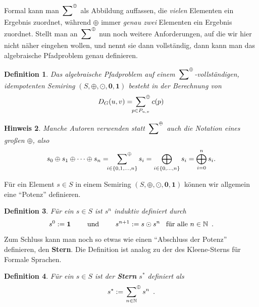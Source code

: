 \documentclass[ngerman, a4paper, 12pt]{article}
\newcommand{\satzende}{\enskip \text{.}}
\theoremstyle{mystyle}
\newtheorem{definition}{Definition}
\newtheorem{hinweis}[definition]{Hinweis}
\begin{document}
	Formal kann man $\sideset{}{^\oplus}\sum$ als Abbildung auffassen, die \textit{vielen} Elementen ein Ergebnis zuordnet, während $\oplus$ immer \textit{genau zwei} Elementen ein Ergebnis zuordnet. Stellt man an $\sideset{}{^\oplus}\sum$ nun noch weitere Anforderungen, auf die wir hier nicht näher eingehen wollen, und nennt sie dann vollständig, dann kann man das algebraische Pfadproblem genau definieren.
	
	\begin{definition}
		Das algebraische Pfadproblem auf einem $\sideset{}{^\oplus}\sum$-vollständigen, idempotenten Semiring $(S, \oplus, \odot, \mathbf{0}, \mathbf{1})$ besteht in der Berechnung von 
		\begin{equation*}
			D_G(u,v) = \sideset{}{^\oplus}\sum_{p \in P_{u,v}} c(p)
		\end{equation*}
	\end{definition}

	\begin{hinweis}
		Manche Autoren verwenden statt $\sideset{}{^\oplus}\sum$ auch die Notation eines großen $\oplus$, also
		\begin{equation*}
			s_0 \oplus s_1 \oplus \dots  \oplus s_n = \sideset{}{^\oplus}\sum_{i \in \left\{ 0, 1, \dots, n \right\}} s_i = \bigoplus_{i \in \left\{ 0, \dots, n \right\}} s_i = \bigoplus_{i=0}^n s_i.
		\end{equation*}
	\end{hinweis}


	Für ein Element $s \in S$ in einem Semiring $(S, \oplus, \odot, \mathbf{0}, \mathbf{1})$ können wir allgemein eine \enquote{Potenz} definieren. 
	
	\begin{definition} \label{def: potenz}
		Für ein $s \in S$ ist $s^n$ induktiv definiert durch 
		\begin{equation*}
			s^0 \defeq \mathbf{1} \qquad \text{ und } \qquad s^{n+1} \defeq s \odot s^n \enskip \text{ für alle } n \in \N
			\satzende
		\end{equation*} 
	\end{definition}
	
	Zum Schluss kann man noch so etwas wie einen \enquote{Abschluss der Potenz} definieren, den \textbf{Stern}. Die Definition ist analog zu der des Kleene-Sterns für Formale Sprachen. 
	
	\begin{definition} \label{def: stern}
		Für ein $s \in S$ ist der \textbf{Stern} $s^\ast$ definiert als
		\begin{equation*}
			s^\ast \defeq \sideset{}{^\oplus}\sum_{n \in \N} s^n
			\satzende
		\end{equation*}
	\end{definition}
	
\end{document}
